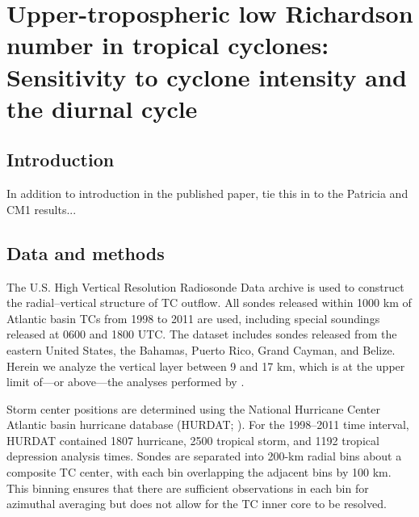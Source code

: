  
\chapter{Upper-tropospheric low Richardson number in tropical cyclones: Sensitivity to cyclone intensity and the diurnal cycle}
\resetfootnote %

\section{Introduction}

In addition to introduction in the published paper, tie this in to the Patricia and CM1 results...

\section{Data and methods}
The U.S. High Vertical Resolution Radiosonde Data archive \citep{LoveGeller2012} is used to construct the radial–vertical structure of TC outflow.
All sondes released within 1000 km of Atlantic basin TCs from 1998 to 2011 are used, including special soundings released at 0600 and 1800 UTC.
The dataset includes sondes released from the eastern United States, the Bahamas, Puerto Rico, Grand Cayman, and Belize.
Herein we analyze the vertical layer between 9 and 17 km, which is at the upper limit of---or above---the analyses performed by \cite{Molinarietal2014}.

Storm center positions are determined using the National Hurricane Center Atlantic basin hurricane database (HURDAT; \citeauthor{Jarvinenetal1984} \citeyear{Jarvinenetal1984}).
For the 1998–2011 time interval, HURDAT contained 1807 hurricane, 2500 tropical storm, and 1192 tropical depression analysis times.
Sondes are separated into 200-km radial bins about a composite TC center, with each bin overlapping the adjacent bins by 100 km.
This binning ensures that there are sufficient observations in each bin for azimuthal averaging but does not allow for the TC inner core to be resolved.

